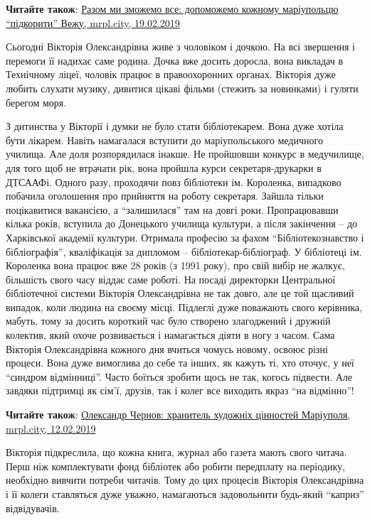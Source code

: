 \textbf{Читайте також}: \href{https://mrpl.city/blogs/view/razom-mi-zmozhemo-vse-dopomozhemo-kozhnomu-mariupoltsyu-pidkoriti-vezhu}{%
Разом ми зможемо все: допоможемо кожному маріупольцю \enquote{підкорити} Вежу, %
mrpl.city, 19.02.2019%
}

Сьогодні Вікторія Олександрівна живе з чоловіком і дочкою. На всі звершення і
перемоги її надихає саме родина. Дочка вже досить доросла, вона викладач в
Технічному ліцеї, чоловік працює в правоохоронних органах. Вікторія дуже любить
слухати музику, дивитися цікаві фільми (стежить за новинками) і гуляти берегом
моря.

З дитинства у Вікторії і думки не було стати бібліотекарем. Вона дуже хотіла
бути лікарем. Навіть намагалася вступити до маріупольського медичного училища.
Але доля розпорядилася інакше. Не пройшовши конкурс в медучилище, для того щоб
не втрачати рік, вона пройшла курси секретаря-друкарки в ДТСААФі. Одного разу,
проходячи повз бібліотеки ім. Короленка, випадково побачила оголошення про
прийняття на роботу секретаря. Зайшла тільки поцікавитися вакансією, а
\enquote{залишилася} там на довгі роки. Пропрацювавши кілька років, вступила до
Донецького училища культури, а після закінчення – до Харківської академії
культури. Отримала професію за фахом \enquote{Бібліотекознавство і бібліографія},
кваліфікація за дипломом – бібліотекар-бібліограф. У бібліотеці ім. Короленка
вона працює вже 28 років (з 1991 року), про свій вибір не жалкує, більшість
свого часу віддає саме роботі. На посаді директорки Центральної бібліотечної
системи Вікторія Олександрівна не так довго, але це той щасливий випадок, коли
людина на своєму місці. Підлеглі дуже поважають свого керівника, мабуть, тому
за досить короткий час було створено злагоджений і дружній колектив, який охоче
розвивається і намагається діяти в ногу з часом. Сама Вікторія Олександрівна
кожного дня вчиться чомусь новому, освоює різні процеси. Вона дуже вимоглива до
себе та інших, як кажуть ті, хто оточує, у неї \enquote{синдром відмінниці}. Часто
боїться зробити щось не так, когось підвести. Але завдяки підтримці як сім'ї,
друзів, так і колег все виходить якраз \enquote{на відмінно}!

\textbf{Читайте також}: \href{https://mrpl.city/blogs/view/oleksandr-chernov-hranitel-hudozhnih-tsinnostej-mariupolya}{%
Олександр Чернов: хранитель художніх цінностей Маріуполя, %
mrpl.city, 12.02.2019%
}

Вікторія підкреслила, що кожна книга, журнал або газета мають свого читача.
Перш ніж комплектувати фонд бібліотек або робити передплату на періодику,
необхідно вивчити потреби читачів. Тому до цих процесів Вікторія Олександрівна
і її колеги ставляться дуже уважно, намагаються задовольнити будь-який \enquote{каприз}
відвідувачів.

